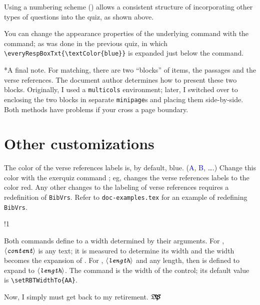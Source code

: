 \documentclass{article}
\makeatletter
\def\dps{$\hbox{$\mathfrak D$\kern-.3em\hbox{$\mathfrak P$}%
   \kern-.6em \hbox{$\mathcal S$}}$}
\def\ameta#1{$\langle\textit{\texttt{#1}}\rangle$}
\let\pkg\textsf
\let\env\texttt
\renewcommand*{\theparagraph}{\texorpdfstring{\protect\P\protect\ }{\textparagraph}}
\renewcommand{\paragraph}
    {\renewcommand{\@seccntformat}[1]{\theparagraph}%
    \@startsection{paragraph}{4}{0pt}{6pt}{-3pt}{\color{\aeb@subsubsectioncolor}\bfseries}}
\makeatother
\begin{document}
\newtopic\noindent Using a numbering scheme () allows a consistent
structure of incorporating other types of questions into the quiz, as shown above.

\newtopic\noindent
You can change the appearance properties of the underlying  command with the
 command; as was done in the previous quiz, in which
\verb|\everyRespBoxTxt{\textColor{blue}}| is expanded just below the  command.

\paragraph*{A final note.} For matching, there are two ``blocks'' of items,
the passages and the verse references. The document author determines how to
present these two blocks. Originally, I used a \env{multicols} environment;
later, I switched over to enclosing the two blocks in separate
\env{minipage}s and placing them side-by-side. Both methods have problems if
your cross a page boundary.

\section{Other customizations}

The color of the verse references labels is, by default, blue.
(\textcolor{blue}{A}, \textcolor{blue}{B}, \dots.) Change this color with the
\pkg{exerquiz} command ; eg, 
changes the verse references labels to the color red. Any other
changes to the labeling of verse references requires a redefinition of
\env{BibVrs}. Refer to \texttt{doc-examples.tex} for an example of redefining
\env{BibVrs}.

\bVerb\takeMeasure{\string\setRBTWidthTo\darg{\ameta{content}}}%
\def\1{\rlap{\hskip\linewidth\textsf{(both define \cs{RBTWidth})}}}%
\begin{dCmd}[commandchars=!()]{\bxSize}
!1
\end{dCmd}
\eVerb Both commands define  to a width determined by their
arguments. For , \ameta{content} is any text; it is
measured to determine its width and the width becomes the expansion of
. For , \ameta{length} and any length,
 then is defined to expand to \ameta{length}. The command
 is the width of the  control; its default value
is \verb~\setRBTWidthTo{AA}~.

\vcgBdry[6pt]

Now, I simply must get back to my retirement. \dps
\end{document}
